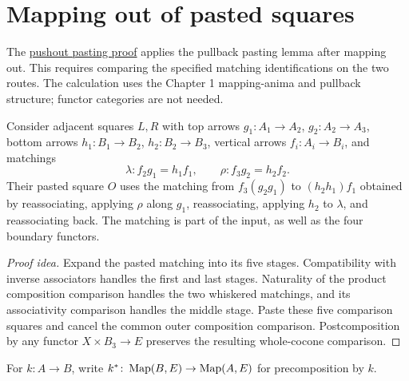 \documentclass[11pt]{article}
\begin{document}
\section*{Mapping out of pasted squares}

The \href{pushouts.html\#lem:Pasting_Lemma_Pushouts}{pushout pasting proof}
applies the pullback pasting lemma after mapping out.
This requires comparing the specified matching identifications on the two
routes. The calculation uses the Chapter 1 mapping-anima and pullback
structure; functor categories are not needed.

Consider adjacent squares $L,R$ with top arrows
$g_1\colon A_1\to A_2$, $g_2\colon A_2\to A_3$, bottom arrows
$h_1\colon B_1\to B_2$, $h_2\colon B_2\to B_3$, vertical arrows
$f_i\colon A_i\to B_i$, and matchings
\[
 \lambda\colon f_2g_1=h_1f_1,\qquad
 \rho\colon f_3g_2=h_2f_2.
\]
Their pasted square $O$ uses the matching from $f_3(g_2g_1)$ to
$(h_2h_1)f_1$ obtained by reassociating, applying $\rho$ along $g_1$,
reassociating, applying $h_2$ to $\lambda$, and reassociating back.
The matching is part of the input, as well as the four boundary functors.

\begin{proof}[Proof idea]
Expand the pasted matching into its five stages. Compatibility with inverse
associators handles the first and last stages. Naturality of the product
composition comparison handles the two whiskered matchings, and its
associativity comparison handles the middle stage. Paste these five
comparison squares and cancel the common outer composition comparison.
Postcomposition by any functor $X\times B_3\to E$ preserves the
resulting whole-cocone comparison.
\end{proof}

For $k\colon A\to B$, write $k^*\colon\operatorname{Map}(B,E)\to\operatorname{Map}(A,E)$
for precomposition by $k$.
\end{document}
